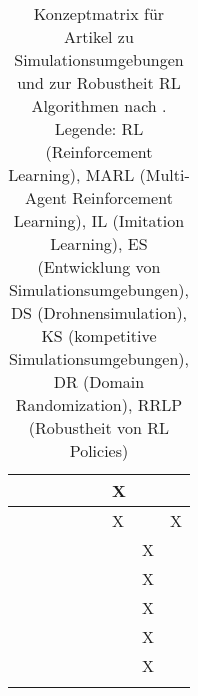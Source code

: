\begin{longtable}{|l|llllllll|}
    \cite[]{Pan.2021}             & \multicolumn{1}{l|}{}   & \multicolumn{1}{l|}{}    & \multicolumn{1}{l|}{}   & \multicolumn{1}{l|}{}   & \multicolumn{1}{l|}{}   & \multicolumn{1}{l|}{X}   & \multicolumn{1}{l|}{}   & \multicolumn{1}{l|}{}      \\ \hline
    \cite[]{Zhai.2022}            & \multicolumn{1}{l|}{}   & \multicolumn{1}{l|}{}    & \multicolumn{1}{l|}{}   & \multicolumn{1}{l|}{}   & \multicolumn{1}{l|}{}   & \multicolumn{1}{l|}{X}   & \multicolumn{1}{l|}{}   & \multicolumn{1}{l|}{X}     \\ \hline
    \cite[]{Tobin.2017}           & \multicolumn{1}{l|}{}   & \multicolumn{1}{l|}{}    & \multicolumn{1}{l|}{}   & \multicolumn{1}{l|}{}   & \multicolumn{1}{l|}{}   & \multicolumn{1}{l|}{}   & \multicolumn{1}{l|}{X}   & \multicolumn{1}{l|}{}     \\ \hline
    \cite[]{Chen.2021}            & \multicolumn{1}{l|}{}   & \multicolumn{1}{l|}{}    & \multicolumn{1}{l|}{}   & \multicolumn{1}{l|}{}   & \multicolumn{1}{l|}{}   & \multicolumn{1}{l|}{}   & \multicolumn{1}{l|}{X}   & \multicolumn{1}{l|}{}     \\ \hline
    \cite[]{Hsu.2023}             & \multicolumn{1}{l|}{}   & \multicolumn{1}{l|}{}    & \multicolumn{1}{l|}{}   & \multicolumn{1}{l|}{}   & \multicolumn{1}{l|}{}   & \multicolumn{1}{l|}{}   & \multicolumn{1}{l|}{X}   & \multicolumn{1}{l|}{}     \\ \hline
    \cite[]{Alghonaim.5302021652021}& \multicolumn{1}{l|}{}   & \multicolumn{1}{l|}{}    & \multicolumn{1}{l|}{}   & \multicolumn{1}{l|}{}   & \multicolumn{1}{l|}{}   & \multicolumn{1}{l|}{}   & \multicolumn{1}{l|}{X}   & \multicolumn{1}{l|}{}     \\ \hline
    \cite[]{Sadeghi.2016}         & \multicolumn{1}{l|}{}   & \multicolumn{1}{l|}{}    & \multicolumn{1}{l|}{}   & \multicolumn{1}{l|}{}   & \multicolumn{1}{l|}{}   & \multicolumn{1}{l|}{}   & \multicolumn{1}{l|}{X}   & \multicolumn{1}{l|}{}     \\ \hline
    \caption{Konzeptmatrix für Artikel zu Simulationsumgebungen und zur Robustheit RL Algorithmen nach \cite[]{10.5555/2017160.2017162}. 
    Legende: RL (Reinforcement Learning), MARL (Multi-Agent Reinforcement Learning), IL (Imitation Learning), ES (Entwicklung von Simulationsumgebungen), DS (Drohnensimulation), KS (kompetitive Simulationsumgebungen), DR (Domain Randomization), RRLP (Robustheit von RL Policies)}
    \label{tab:research-table}\\
\end{longtable}